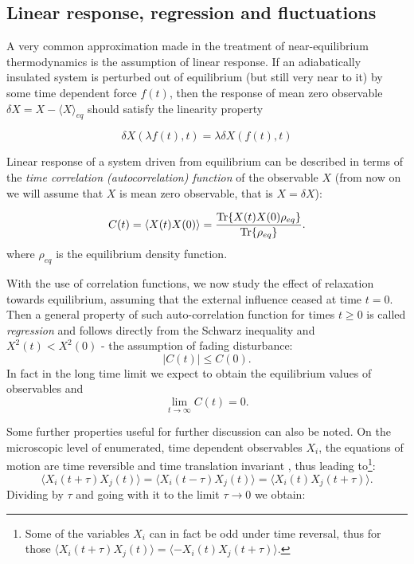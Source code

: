 \documentclass[a4paper,12pt]{article}
\begin{document}
\subsection{Linear response, regression and fluctuations}

A very common approximation made in the treatment of near-equilibrium thermodynamics is the assumption of linear response. If an adiabatically insulated system is perturbed out of equilibrium (but still very near to it) by some time dependent force $f(t)$, then the response of mean zero observable $\delta X= X-\langle X \rangle_{eq}$  should satisfy the linearity property

\begin{equation}
\label{LiearityProperty}
  \delta X(\lambda f(t),t) = \lambda \delta X(f(t),t)
\end{equation}

Linear response of a system driven from equilibrium can be described in terms of the \textit{time correlation (autocorrelation) function} of the observable $X$ (from now on we will assume that $X$ is mean zero observable, that is $X=\delta X$):
 
\begin{equation}
  C(t)=\langle X(t)X(0) \rangle = \frac{\Tr{X(t)X(0)\rho_{eq}}}{\Tr{\rho_{eq}}}.
\end{equation}
where $\rho_{eq}$ is the equilibrium density function.

With the use of correlation functions, we now study the effect of relaxation towards equilibrium, assuming that the external influence ceased at time $t=0$.
Then a general property of such auto-correlation function for times $t\geq 0$ is called \textit{regression} and follows directly from the Schwarz inequality and $X^2(t)<X^2(0)$ - the assumption of fading disturbance:
\begin{equation}
 | C(t) | \leq C(0).
\end{equation}
In fact in the long time limit we expect to obtain the equilibrium values of observables and
\begin{equation}
  \lim_{t \to \infty} C(t)=0.
\end{equation}

Some further properties useful for further discussion can also be noted.
On the microscopic level of enumerated, time dependent observables $X_i$, the equations of motion are time reversible and time translation invariant \cite{Anonymous:vN0-ttAB}, thus leading to\footnote{Some of the variables $X_i$ can in fact be odd under time reversal, thus for those $\langle X_i(t+\tau) X_j(t) \rangle = \langle -X_i(t) X_j(t+\tau) \rangle$.}:
\begin{equation}
  \langle X_i(t+\tau) X_j(t) \rangle =   \langle X_i(t-\tau) X_j(t) \rangle =  \langle X_i(t) X_j(t+\tau) \rangle.
\end{equation}
Dividing by $\tau$ and going with it to the limit $\tau \to 0$ we obtain: 
\end{document}
